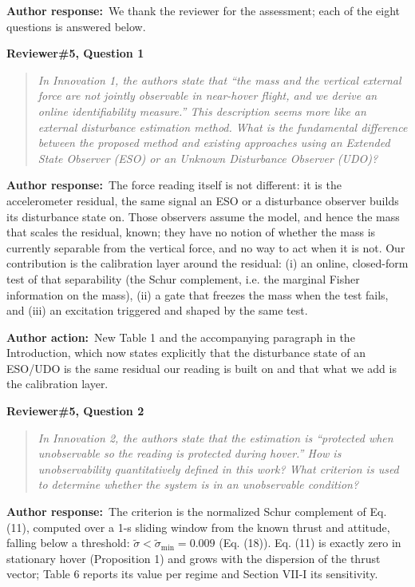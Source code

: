 \documentclass[11pt]{article}
\newcommand{\concern}[1]{\par\medskip\noindent\colorbox{gray!12}{\parbox{\dimexpr\linewidth-2\fboxsep}{\textbf{#1}}}\par\smallskip}
\newcommand{\rlabel}[1]{\par\textbf{#1}\ }
\begin{document}
\rlabel{Author response:}We thank the reviewer for the assessment; each of the eight questions is answered below.

\concern{Reviewer\#5, Question 1}

\begin{quote}\itshape In Innovation 1, the authors state that ``the mass and the vertical external force are not jointly observable in near-hover flight, and we derive an online identifiability measure.'' This description seems more like an external disturbance estimation method. What is the fundamental difference between the proposed method and existing approaches using an Extended State Observer (ESO) or an Unknown Disturbance Observer (UDO)?\end{quote}

\rlabel{Author response:}The force reading itself is not different: it is the accelerometer residual, the same signal an ESO or a disturbance observer builds its disturbance state on. Those observers assume the model, and hence the mass that scales the residual, known; they have no notion of whether the mass is currently separable from the vertical force, and no way to act when it is not. Our contribution is the calibration layer around the residual: (i) an online, closed-form test of that separability (the Schur complement, i.e. the marginal Fisher information on the mass), (ii) a gate that freezes the mass when the test fails, and (iii) an excitation triggered and shaped by the same test.

\rlabel{Author action:}New Table 1 and the accompanying paragraph in the Introduction, which now states explicitly that the disturbance state of an ESO/UDO is the same residual our reading is built on and that what we add is the calibration layer.

\concern{Reviewer\#5, Question 2}

\begin{quote}\itshape In Innovation 2, the authors state that the estimation is ``protected when unobservable so the reading is protected during hover.'' How is unobservability quantitatively defined in this work? What criterion is used to determine whether the system is in an unobservable condition?\end{quote}

\rlabel{Author response:}The criterion is the normalized Schur complement of Eq. (11), computed over a 1-s sliding window from the known thrust and attitude, falling below a threshold: $\tilde\sigma < \tilde\sigma_{\min} = 0.009$ (Eq. (18)). Eq. (11) is exactly zero in stationary hover (Proposition 1) and grows with the dispersion of the thrust vector; Table 6 reports its value per regime and Section VII-I its sensitivity.
\end{document}
